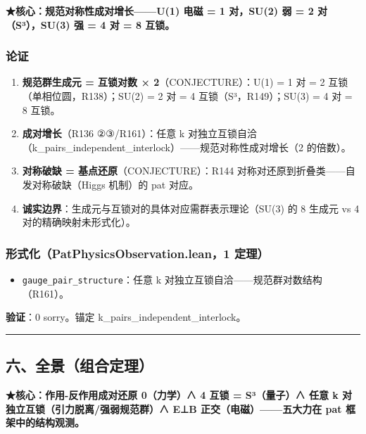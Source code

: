 \documentclass[
]{article}
\providecommand{\tightlist}{%
 \setlength{\itemsep}{0pt}\setlength{\parskip}{0pt}}
\begin{document}
\textbf{★核心：规范对称性成对增长------U(1) 电磁 = 1 对，SU(2) 弱 = 2
对（S³），SU(3) 强 = 4 对 = 8 互锁。}

\subsubsection{论证}\label{ux8bbaux8bc1-4}

\begin{enumerate}
\def\labelenumi{\arabic{enumi}.}
\tightlist
\item
 \textbf{规范群生成元 = 互锁对数 × 2}（CONJECTURE）：U(1) = 1 对 = 2
 互锁（单相位圆，R138）；SU(2) = 2 对 = 4 互锁（S³，R149）；SU(3) = 4
 对 = 8 互锁。
\item
 \textbf{成对增长}（R136 ②③/R161）：任意 k
 对独立互锁自洽（k\_pairs\_independent\_interlock）------规范对称性成对增长（2
 的倍数）。
\item
 \textbf{对称破缺 = 基点还原}（CONJECTURE）：R144
 对称对还原到折叠类------自发对称破缺（Higgs 机制）的 pat 对应。
\item
 \textbf{诚实边界}：生成元与互锁对的具体对应需群表示理论（SU(3) 的 8
 生成元 vs 4 对的精确映射未形式化）。
\end{enumerate}

\subsubsection{形式化（PatPhysicsObservation.lean，1
定理）}\label{ux5f62ux5f0fux5316patphysicsobservation.lean1-ux5b9aux7406-2}

\begin{itemize}
\tightlist
\item
 \texttt{gauge\_pair\_structure}：任意 k
 对独立互锁自洽------规范群对数结构（R161）。
\end{itemize}

\textbf{验证}：0 sorry。锚定 k\_pairs\_independent\_interlock。

\begin{center}\rule{0.5\linewidth}{0.5pt}\end{center}

\subsection{六、全景（组合定理）}\label{ux516dux5168ux666fux7ec4ux5408ux5b9aux7406}

\textbf{★核心：作用-反作用成对还原 0（力学）∧ 4 互锁 = S³（量子）∧ 任意
k 对独立互锁（引力脱离/强弱规范群）∧ E⊥B 正交（电磁）------五大力在 pat
框架中的结构观测。}
\end{document}
